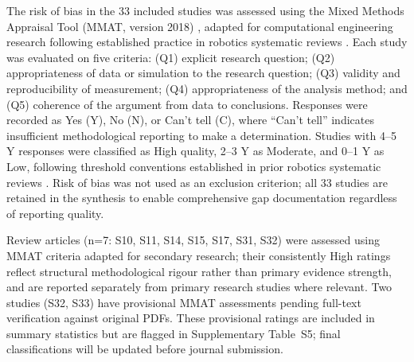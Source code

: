\documentclass[review,3p,times]{elsarticle}
\begin{document}
The risk of bias in the 33 included studies was assessed using the Mixed Methods Appraisal Tool (MMAT, version 2018) \cite{hong2018}, adapted for computational engineering research following established practice in robotics systematic reviews \cite{brambilla2013}. Each study was evaluated on five criteria: (Q1) explicit research question; (Q2) appropriateness of data or simulation to the research question; (Q3) validity and reproducibility of measurement; (Q4) appropriateness of the analysis method; and (Q5) coherence of the argument from data to conclusions. Responses were recorded as Yes (Y), No (N), or Can't tell (C), where ``Can't tell'' indicates insufficient methodological reporting to make a determination. Studies with 4--5 Y responses were classified as High quality, 2--3 Y as Moderate, and 0--1 Y as Low, following threshold conventions established in prior robotics systematic reviews \cite{brambilla2013,bayindir2016}. Risk of bias was not used as an exclusion criterion; all 33 studies are retained in the synthesis to enable comprehensive gap documentation regardless of reporting quality.

Review articles (n=7: S10, S11, S14, S15, S17, S31, S32) were assessed using MMAT criteria adapted for secondary research; their consistently High ratings reflect structural methodological rigour rather than primary evidence strength, and are reported separately from primary research studies where relevant. Two studies (S32, S33) have provisional MMAT assessments pending full-text verification against original PDFs. These provisional ratings are included in summary statistics but are flagged in Supplementary Table~S5; final classifications will be updated before journal submission.
\end{document}
